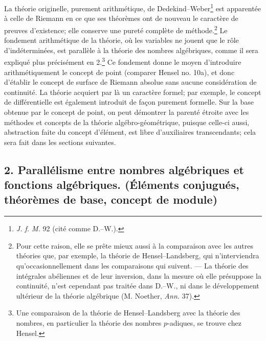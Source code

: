 La théorie originelle, purement arithmétique, de Dedekind--Weber\footnote{\emph{J. f. M.} 92 (cité comme D.--W.).} est apparentée à celle de Riemann en ce que ses théorèmes ont de nouveau le caractère de preuves d'existence; elle conserve une pureté complète de méthode.\footnote{Pour cette raison, elle se prête mieux aussi à la comparaison avec les autres théories que, par exemple, la théorie de Hensel--Landsberg, qui n'interviendra qu'occasionnellement dans les comparaisons qui suivent. --- La théorie des intégrales abéliennes et de leur inversion, dans la mesure où elle présuppose la continuité, n'est cependant pas traitée dans D.--W., ni dans le développement ultérieur de la théorie algébrique (M. Noether, \emph{Ann.} 37).} Le fondement arithmétique de la théorie, où les variables ne jouent que le rôle d'indéterminées, est parallèle à la théorie des nombres algébriques, comme il sera expliqué plus précisément en 2.\footnote{Une comparaison de la théorie de Hensel--Landsberg avec la théorie des nombres, en particulier la théorie des nombres \(p\)-adiques, se trouve chez Hensel.} Ce fondement donne le moyen d'introduire arithmétiquement le concept de point (comparer Hensel no. 10a), et donc d'établir le concept de surface de Riemann absolue sans aucune considération de continuité. La théorie acquiert par là un caractère formel; par exemple, le concept de différentielle est également introduit de façon purement formelle. Sur la base obtenue par le concept de point, on peut démontrer la parenté étroite avec les méthodes et concepts de la théorie algébro-géométrique, puisque celle-ci aussi, abstraction faite du concept d'élément, est libre d'auxiliaires transcendants; cela sera fait dans les sections suivantes.

\subsection*{2. Parallélisme entre nombres algébriques et fonctions algébriques. (Éléments conjugués, théorèmes de base, concept de module)}

